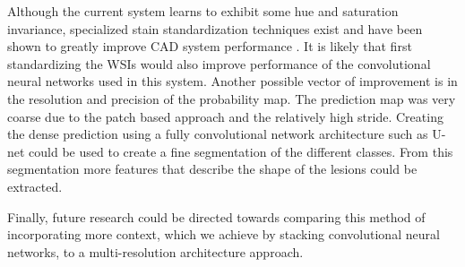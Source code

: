 \documentclass[journal]{IEEEtran}
\begin{document}
Although the current system learns to exhibit some hue and saturation invariance, specialized stain standardization techniques exist and have been shown to greatly improve CAD system performance \cite{bejnordi2016stain}. It is likely that first standardizing the WSIs would also improve performance of the convolutional neural networks used in this system. Another possible vector of improvement is in the resolution and precision of the probability map. The prediction map was very coarse due to the patch based approach and the relatively high stride. Creating the dense prediction using a fully convolutional network architecture such as U-net \cite{unet} could be used to create a fine segmentation of the different classes. From this segmentation more features that describe the shape of the lesions could be extracted.

Finally, future research could be directed towards comparing this method of incorporating more context, which we achieve by stacking convolutional neural networks, to a multi-resolution architecture approach.






%


\end{document}
